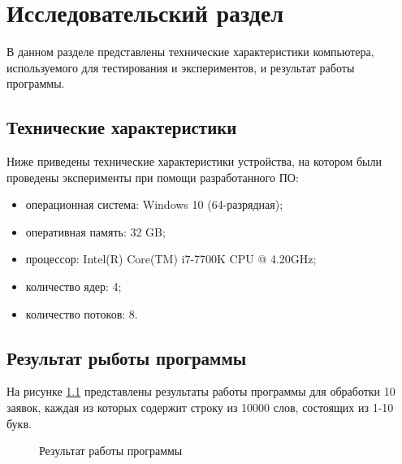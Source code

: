 \chapter{Исследовательский раздел}
В данном разделе представлены технические характеристики компьютера, используемого для тестирования и экспериментов, и результат работы программы.
 \section{Технические характеристики}

Ниже приведены технические характеристики устройства, на котором были проведены эксперименты при помощи разработанного ПО:

\begin{itemize}
	\item операционная система: Windows 10 (64-разрядная);
	\item оперативная память: 32 GB;
	\item процессор: Intel(R) Core(TM) i7-7700K CPU @ 4.20GHz;
	\item количество ядер: 4;
	\item количество потоков: 8.
\end{itemize}

\section{Результат рыботы программы}
На рисунке \ref{results} представлены результаты работы программы для обработки 10 заявок, каждая из которых содержит строку из 10000 слов, состоящих из 1-10 букв.

\begin{figure}[h]
	\caption{Результат работы программы}
	\label{results}
\end{figure}

